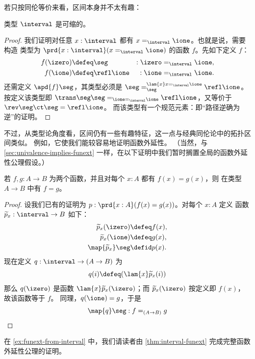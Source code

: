 若只按同伦等价来看，区间本身并不太有趣：

\begin{lem}\label{thm:contr-interval}
  类型 $\interval$ 是可缩的。
\end{lem}

\begin{proof}
  我们证明对任意 $x:\interval$ 都有 $x=_\interval\ione$。也就是说，需要构造
  类型为 $\prd{x:\interval}(x=_\interval\ione)$ 的函数 $f$。先如下定义 $f$：
  \begin{alignat*}{2}
    f(\izero)&\defeq \seg  &:\izero&=_\interval\ione,\\
    f(\ione)&\defeq \refl\ione &:\ione &=_\interval\ione.
  \end{alignat*}
  还需定义 $\apd{f}\seg$，其类型必须是 $\seg =_\seg^{\lam{x} x=_\interval\ione}\refl \ione$。
  按定义该类型即 $\trans\seg\seg=_{\ione=_\interval\ione}\refl\ione$，又等价于 $\rev\seg\ct\seg=\refl\ione$。
  而该类型有一个规范元素：即“路径逆确为逆”的证明。
\end{proof}

不过，从类型论角度看，区间仍有一些有趣特征，这一点与经典同伦论中的拓扑区间类似。
例如，它使我们能较容易地证明函数外延性。
（当然，与 \cref{sec:univalence-implies-funext} 一样，在以下证明中我们暂时搁置全局的函数外延性公理假设。）

\begin{lem}\label{thm:interval-funext}
  若 $f,g:A\to{}B$ 为两个函数，并且对每个 $x:A$ 都有 $f(x)=g(x)$，则
  在类型 $A\to{}B$ 中有 $f=g$。
\end{lem}

\begin{proof}
  设我们已有的证明为 $p:\prd{x:A}(f(x)=g(x))$。对每个 $x:A$ 定义
  函数 $\widetilde{p}_x:\interval\to{}B$ 如下：
  \begin{align*}
    \widetilde{p}_x(\izero) &\defeq f(x), \\
    \widetilde{p}_x(\ione) &\defeq g(x), \\
    \map{\widetilde{p}_x}\seg &\defid p(x).
  \end{align*}
  现在定义 $q:\interval\to(A\to{}B)$ 为
  \[q(i)\defeq(\lam{x} \widetilde{p}_x(i))\]
  那么 $q(\izero)$ 是函数 $\lam{x} \widetilde{p}_x(\izero)$；而 $\widetilde{p}_x(\izero)$ 按定义即 $f(x)$，故该函数等于 $f$。
  同理，$q(\ione)=g$，于是
  \[\map{q}\seg:f=_{(A\to{}B)}g \qedhere\]
\end{proof}

在 \cref{ex:funext-from-interval} 中，我们请读者由 \cref{thm:interval-funext} 完成完整函数外延性公理的证明。


